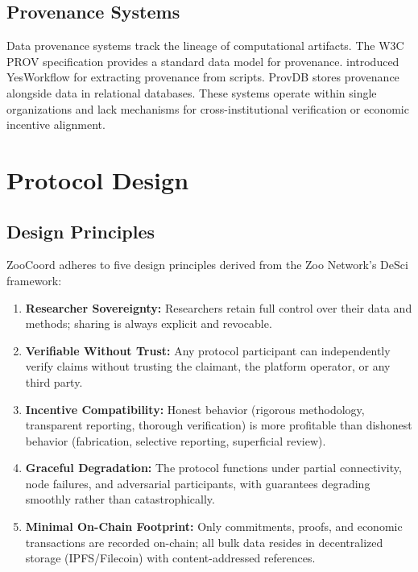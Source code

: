 \documentclass[11pt,a4paper]{article}
\begin{document}
\subsection{Provenance Systems}

Data provenance systems track the lineage of computational artifacts.
The W3C PROV specification \citep{moreau2013prov} provides a standard data model for provenance.
\citet{mcphillips2015yesworkflow} introduced YesWorkflow for extracting provenance from scripts.
ProvDB \citep{miao2018provdb} stores provenance alongside data in relational databases.
These systems operate within single organizations and lack mechanisms for cross-institutional verification or economic incentive alignment.

\section{Protocol Design}
\label{sec:protocol}

\subsection{Design Principles}

ZooCoord adheres to five design principles derived from the Zoo Network's DeSci framework:

\begin{enumerate}[leftmargin=*]
    \item \textbf{Researcher Sovereignty:} Researchers retain full control over their data and methods; sharing is always explicit and revocable.
    \item \textbf{Verifiable Without Trust:} Any protocol participant can independently verify claims without trusting the claimant, the platform operator, or any third party.
    \item \textbf{Incentive Compatibility:} Honest behavior (rigorous methodology, transparent reporting, thorough verification) is more profitable than dishonest behavior (fabrication, selective reporting, superficial review).
    \item \textbf{Graceful Degradation:} The protocol functions under partial connectivity, node failures, and adversarial participants, with guarantees degrading smoothly rather than catastrophically.
    \item \textbf{Minimal On-Chain Footprint:} Only commitments, proofs, and economic transactions are recorded on-chain; all bulk data resides in decentralized storage (IPFS/Filecoin) with content-addressed references.
\end{enumerate}
\end{document}
